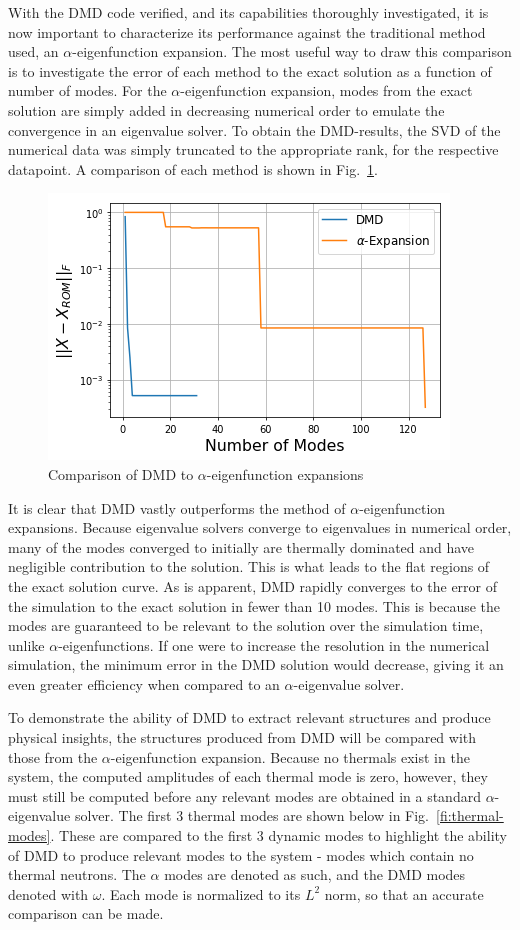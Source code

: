 \documentclass[12pt]{article}
\newcommand{\LFI}[1]{\label{fi:#1}}
\newcommand{\FI}[1]{Fig.~\ref{fi:#1}}
\newcommand{\bfg}{\begin{figure}}
\newcommand{\efg}{\end{figure}}
\begin{document}
With the DMD code verified, and its capabilities thoroughly investigated, it is 
	now important to characterize its performance against the traditional 
	method used, an $\alpha$-eigenfunction expansion.
The most useful way to draw this comparison is to investigate the error of each 
	method to the exact solution as a function of number of modes.
For the $\alpha$-eigenfunction expansion, modes from the exact solution are 
	simply added in decreasing numerical order to emulate the convergence in an 
	eigenvalue solver.
To obtain the DMD-results, the SVD of the numerical data was simply truncated 
	to the appropriate rank, for the respective datapoint.
A comparison of each method is shown in \FI{comp}. 
%
\bfg[!htb] \centering
	\includegraphics[scale=0.5]{method_comparison.png}
	\caption{Comparison of DMD to $\alpha$-eigenfunction expansions}
	\LFI{comp}
\efg

It is clear that DMD vastly outperforms the method of $\alpha$-eigenfunction 
	expansions.
Because eigenvalue solvers converge to eigenvalues in numerical order, many of 
	the modes converged to initially are thermally dominated and have negligible 
	contribution to the solution. 
This is what leads to the flat regions of the exact solution curve.
As is apparent, DMD rapidly converges to the error of the simulation to the 
	exact solution in fewer than 10 modes.
This is because the modes are guaranteed to be relevant to the solution over the
	simulation time, unlike $\alpha$-eigenfunctions.
If one were to increase the resolution in the numerical simulation, the minimum
	error in the DMD solution would decrease, giving it an even greater efficiency
	when compared to an $\alpha$-eigenvalue solver.

To demonstrate the ability of DMD to extract relevant structures and produce
	physical insights, the structures produced from DMD will be compared with 
	those from the $\alpha$-eigenfunction expansion.
Because no thermals exist in the system, the computed amplitudes of each 
	thermal mode is zero, however, they must still be computed before any 
	relevant modes are obtained in a standard $\alpha$-eigenvalue solver.
The first 3 thermal modes are shown below in \FI{thermal-modes}.
These are compared to the first 3 dynamic modes to highlight the ability of 
	DMD to produce relevant modes to the system - modes which contain no
	thermal neutrons.
The $\alpha$ modes are denoted as such, and the DMD modes denoted with $\omega$.
Each mode is normalized to its $L^2$ norm, so that an accurate comparison can 
	be made.
\end{document}
